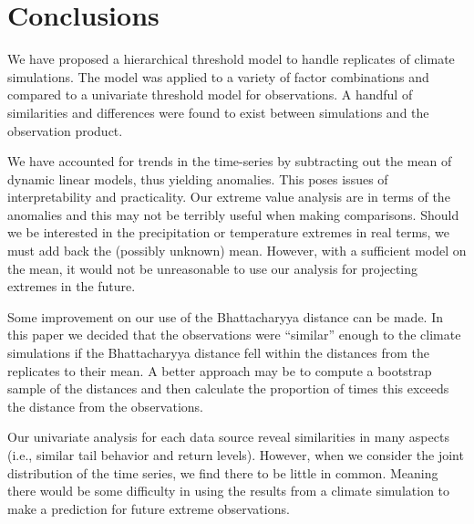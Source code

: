 \section{Conclusions}
\label{conclusions}

We have proposed a hierarchical threshold model to handle replicates of climate simulations. The model was applied to a variety of factor combinations and compared to a univariate threshold model for observations. A handful of similarities and differences were found to exist between simulations and the observation product.

We have accounted for trends in the time-series by subtracting out the mean of dynamic linear models, thus yielding anomalies. This poses issues of interpretability and practicality. Our extreme value analysis are in terms of the anomalies and this may not be terribly useful when making comparisons. Should we be interested in the precipitation or temperature extremes in real terms, we must add back the (possibly unknown) mean. However, with a sufficient model on the mean, it would not be unreasonable to use our analysis for projecting extremes in the future.

Some improvement on our use of the Bhattacharyya distance can be made. In this paper we decided that the observations were ``similar'' enough to the climate simulations if the Bhattacharyya distance fell within the distances from the replicates to their mean. A better approach may be to compute a bootstrap sample of the distances and then calculate the proportion of times this exceeds the distance from the observations. 

Our univariate analysis for each data source reveal similarities in many aspects (i.e., similar tail behavior and return levels). However, when we consider the joint distribution of the time series, we find there to be little in common. Meaning there would be some difficulty in using the results from a climate simulation to make a prediction for future extreme observations.

